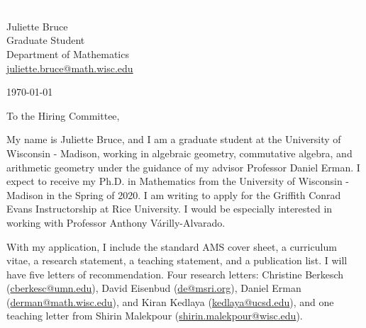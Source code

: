 \documentclass[11pt]{article}
\begin{document}
\section*{}

\noindent
\begin{minipage}{0.99\textwidth}
\begin{minipage}{0.69\textwidth}
\textcolor{white}{.}
\end{minipage}
\begin{minipage}{0.29\textwidth}
{
Juliette Bruce \\
Graduate Student \\
Department of Mathematics \\
\href{mailto:juliette.bruce@math.wisc.edu}{juliette.bruce@math.wisc.edu}
}

\vspace{12pt}
\today
\end{minipage}
\end{minipage}


\vspace{12pt}
\noindent
To the Hiring Committee,

My name is Juliette Bruce, and I am a graduate student at the University of Wisconsin - Madison, working in algebraic geometry, commutative algebra, and arithmetic geometry under the guidance of my advisor Professor Daniel Erman. I expect to receive my Ph.D. in Mathematics from the University of Wisconsin - Madison in the Spring of 2020. I am writing to apply for the Griffith Conrad Evans Instructorship at Rice University. I would be especially interested in working with Professor Anthony V\'{a}rilly-Alvarado.

With my application, I include the standard AMS cover sheet, a curriculum vitae, a research statement, a teaching statement, and a publication list. I will have five letters of recommendation. Four research letters: Christine Berkesch (\href{mailto:cberkesc@umn.edu}{cberkesc@umn.edu}), David Eisenbud (\href{mailto:de@msri.org}{de@msri.org}), Daniel Erman (\href{mailto:derman@math.wisc.edu}{derman@math.wisc.edu}), and Kiran Kedlaya (\href{mailto:kedlaya@ucsb.edu}{kedlaya@ucsd.edu}), and one teaching letter from Shirin Malekpour (\href{mailto:shirin.malekpour@wisc.edu}{shirin.malekpour@wisc.edu}).
\end{document}
